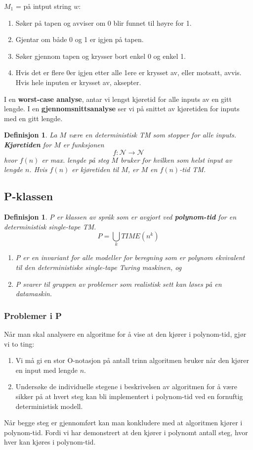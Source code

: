 \documentclass[11pt,a4paper]{article}
\begin{document}
$M_1$ = på intput string $w$:
\begin{enumerate}
\item{Søker på tapen og avviser om 0 blir funnet til høyre for 1.}
\item{Gjentar om både 0 og 1 er igjen på tapen.}
\item{Søker gjennom tapen og krysser bort enkel 0 og enkel 1.}
\item{Hvis det er flere 0er igjen etter alle 1ere er krysset av, eller motsatt, avvis. Hvis hele inputen er krysset av, aksepter.}
\end{enumerate}

I en \textbf{worst-case analyse}, antar vi lengst kjøretid for alle inputs av en gitt lengde. I en \textbf{gjennomsnittsanalyse} ser vi på snittet av kjøretiden for inputs med en gitt lengde. 

\theoremstyle{mytheoremstyle}
\newtheorem{tid}{Definisjon}[section]
\begin{tid}
La $M$ være en deterministisk TM som stopper for alle inputs. \textbf{Kjøretiden} for $M$ er funksjonen
$$f:\mathcal{N \rightarrow N}$$
hvor $f(n)$ er max. lengde på steg $M$ bruker for hvilken som helst input av lengde $n$. Hvis $f(n)$ er kjøretiden til $M$, er $M$ en $f(n)$-tid TM.
\end{tid}

\subsection{P-klassen}
\theoremstyle{mytheoremstyle}
\newtheorem{ptid}{Definisjon}[section]
\begin{ptid}
P er klassen av språk som er avgjort ved \textbf{polynom-tid} for en deterministisk single-tape TM.
$$P = \bigcup_{k} TIME (n^k)$$

\begin{enumerate}
\item{P er en invariant for alle modeller for beregning som er polynom ekvivalent til den deterministiske single-tape Turing maskinen, og}
\item{P svarer til gruppen av problemer som realistisk sett kan løses på en datamaskin.}
\end{enumerate}
\end{ptid}

\subsubsection{Problemer i P}
Når man skal analysere en algoritme for å vise at den kjører i polynom-tid, gjør vi to ting:
\begin{enumerate}
\item{Vi må gi en stor O-notasjon på antall trinn algoritmen bruker når den kjører en input med lengde $n$.}
\item{Undersøke de individuelle stegene i beskrivelsen av algoritmen for å være sikker på at hvert steg kan bli implementert i polynom-tid ved en fornuftig deterministisk modell.}
\end{enumerate}
Når begge steg er gjennomført kan man konkludere med at algoritmen kjører i polynom-tid. Fordi vi har demonstrert at den kjører i polynomt antall steg, hvor hver kan kjøres i polynom-tid.
\end{document}
